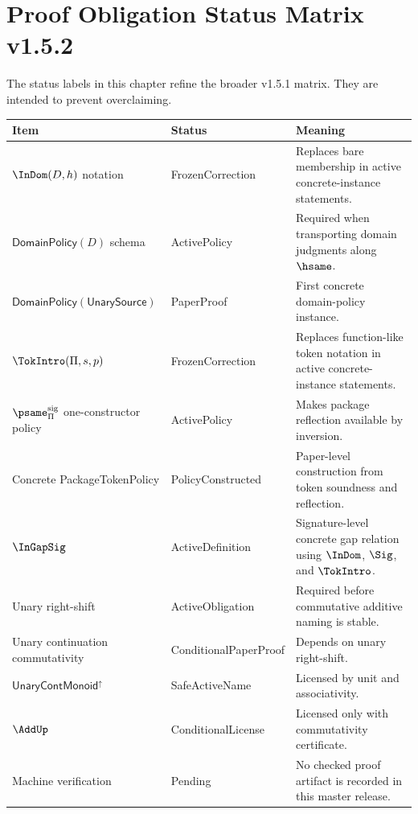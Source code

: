 
\chapter{Proof Obligation Status Matrix v1.5.2}
\label{ch:v152-status-matrix}

The status labels in this chapter refine the broader v1.5.1 matrix. They are intended to prevent overclaiming.

\begin{longtable}{p{}p{}p{}}
\toprule
\textbf{Item} & \textbf{Status} & \textbf{Meaning}\\
\midrule
\(\InDom(D,h)\) notation & FrozenCorrection & Replaces bare membership in active concrete-instance statements.\\
\(\mathsf{DomainPolicy}(D)\) schema & ActivePolicy & Required when transporting domain judgments along \(\hsame\).\\
\(\mathsf{DomainPolicy}(\mathsf{UnarySource})\) & PaperProof & First concrete domain-policy instance.\\
\(\TokIntro(\Pi,s,p)\) & FrozenCorrection & Replaces function-like token notation in active concrete-instance statements.\\
\(\psame_{\Pi}^{\mathrm{sig}}\) one-constructor policy & ActivePolicy & Makes package reflection available by inversion.\\
Concrete PackageTokenPolicy & PolicyConstructed & Paper-level construction from token soundness and reflection.\\
\(\InGapSig\) & ActiveDefinition & Signature-level concrete gap relation using \(\InDom\), \(\Sig\), and \(\TokIntro\).\\
Unary right-shift & ActiveObligation & Required before commutative additive naming is stable.\\
Unary continuation commutativity & ConditionalPaperProof & Depends on unary right-shift.\\
\(\mathsf{UnaryContMonoid}^{\uparrow}\) & SafeActiveName & Licensed by unit and associativity.\\
\(\AddUp\) & ConditionalLicense & Licensed only with commutativity certificate.\\
Machine verification & Pending & No checked proof artifact is recorded in this master release.\\
\bottomrule
\end{longtable}
